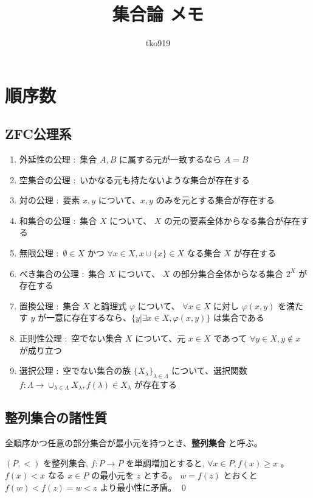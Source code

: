 \documentclass[dvipdfmx,a4paper]{jsreport}
\title{集合論 メモ}
\author{tko919}
\date{}
\theoremstyle{definition}
\renewcommand{\phi}{\varphi}
\begin{document}
\maketitle
\tableofcontents

\chapter{順序数}

\section{ZFC公理系}
\begin{enumerate}
    \item 外延性の公理 $\colon$ 集合 $A,B$ に属する元が一致するなら $A=B$
    \item 空集合の公理 $\colon$ いかなる元も持たないような集合が存在する
    \item 対の公理 $\colon$ 要素 $x,y$ について、$x,y$ のみを元とする集合が存在する
    \item 和集合の公理 $\colon$ 集合 $X$ について、 $X$ の元の要素全体からなる集合が存在する
    \item 無限公理 $\colon$ $\emptyset \in X$ かつ $\forall x \in X,x \cup \{x\} \in X$ なる集合 $X$ が存在する
    \item べき集合の公理 $\colon$ 集合 $X$ について、 $X$ の部分集合全体からなる集合 $2^X$ が存在する
    \item 置換公理 $\colon$ 集合 $X$ と論理式 $\phi$ について、 $\forall x \in X$ に対し $\phi(x,y)$ を満たす $y$ が一意に存在するなら、$\{y | \exists x \in X,\phi(x,y)\}$ は集合である
    \item 正則性公理 $\colon$ 空でない集合 $X$ について、元 $x\in X$ であって $\forall y \in X,y \notin x$ が成り立つ
    \item 選択公理 $\colon$ 空でない集合の族 $\{X_\lambda\}_{\lambda \in \Lambda}$ について、選択関数 $f:\Lambda \to \cup_{\lambda \in \Lambda}X_{\lambda},f(\lambda) \in X_{\lambda}$ が存在する
\end{enumerate}

\section{整列集合の諸性質}
 全順序かつ任意の部分集合が最小元を持つとき、\textbf{整列集合} と呼ぶ。

\prop\label{monotone} $(P,<)$ を整列集合, $f:P \to P$ を単調増加とすると, $\forall x \in P,f(x) \geq x$ 。
\prf $f(x)<x$ なる $x \in P$ の最小元を $z$ とする。 $w=f(z)$ とおくと $f(w)<f(z)=w<z$ より最小性に矛盾。 \qed
\end{document}
